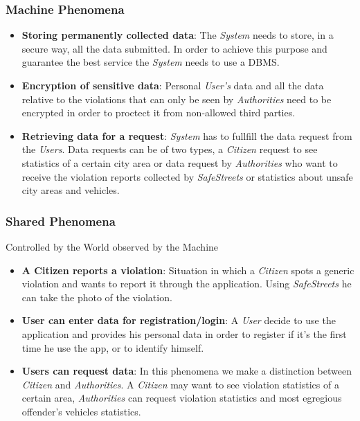 \documentclass{article}
\begin{document}
\subsubsection{Machine Phenomena}
\begin{itemize}
    \item \textbf{Storing permanently collected data}:
    The \textit{System} needs to store, in a secure way, all the data submitted.
    In order to achieve this purpose and guarantee the best service
    the \textit{System} needs to use a DBMS.
    \item \textbf{Encryption of sensitive data}:
    Personal \textit{User's} data and all the data relative to the violations
    that can only be seen by \textit{Authorities} need to be encrypted in order
    to proctect it from non-allowed third parties. 
    \item \textbf{Retrieving data for a request}:
    \textit{System} has to fullfill the data request from the \textit{Users}. Data 
    requests can be of two types, a \textit{Citizen} request to see
    statistics of a certain city area or data request by \textit{Authorities}
    who want to receive the violation reports collected by \textit{SafeStreets} or 
    statistics about unsafe city areas and vehicles.
\end{itemize}

\subsubsection{Shared Phenomena}
Controlled by the World observed by the Machine
\begin{itemize}
    \item \textbf{A Citizen reports a violation}:
    Situation in which a \textit{Citizen} spots a generic violation and wants
    to report it through the application. Using \textit{SafeStreets} he
    can take the photo of the violation.
    \item \textbf{User can enter data for registration/login}:
    A \textit{User} decide to use the application and provides his personal data
    in order to register if it's the first time he use the app, or to
    identify himself.
    \item \textbf{Users can request data}:
    In this phenomena we make a distinction between \textit{Citizen} and \textit{Authorities}.
    A \textit{Citizen} may want to see violation statistics of a certain area, \textit{Authorities} can request
    violation statistics and most egregious offender's vehicles statistics.
\end{itemize}
\end{document}
